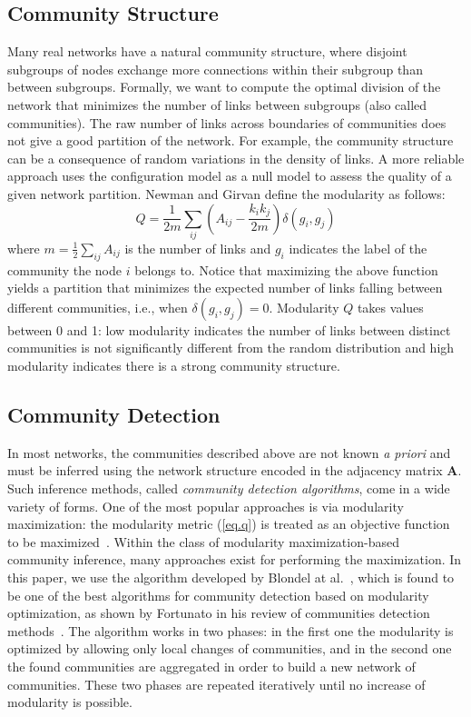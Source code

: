 \documentclass[12pt]{article}
\begin{document}
\subsection{Community Structure}

Many real networks have a natural community structure, where disjoint subgroups of nodes exchange more connections within their subgroup than between subgroups. Formally, we want to compute the optimal division of the network that minimizes the number of links between subgroups (also called  communities). The raw number of links across boundaries of communities does not give a good partition of the  network. For example, the community structure can be a consequence of random variations in the density of links. A more reliable approach uses the configuration model \cite{newman2001random} as a null model to assess the quality of a given network partition. Newman and Girvan \cite{newman2004finding} define the modularity as follows:
\begin{equation}
Q = \frac{1}{2m} \sum_{ij} \left( A_{ij} -
\frac{k_i k_j}{2m} \right) \delta(g_i,g_j)
\label{eq.q}
\end{equation}
where $m = \frac{1}{2} \sum_{ij} A_{ij}$ is the number of links and $g_i$
indicates the label of the community the node $i$
belongs to. Notice that maximizing the above function yields a partition that minimizes the 
expected number of links falling between different communities, i.e., when 
$\delta(g_i, g_j) = 0$. 
Modularity $Q$ takes values between 0 and 1: low modularity indicates the number of links 
between distinct communities is not significantly different from the random distribution and high 
modularity indicates there is a strong community structure.

\subsection{Community Detection}

In most networks, the communities described above are not known \emph{a priori} and must be inferred using the network structure encoded in the adjacency matrix $\textbf{A}$. Such inference methods, called \emph{community detection algorithms}, come in a wide variety of forms. One of the most popular approaches is via modularity maximization: the modularity metric (\ref{eq.q}) is treated as an objective function to be maximized~\cite{newman2004finding}. Within the class of modularity maximization-based community inference, many approaches exist for performing the maximization. In this paper, we use the algorithm developed by Blondel at al\@.~\cite{blondel2008fast}, which is found to be one of the best algorithms for community detection based on modularity 
optimization, as shown by Fortunato in his review of communities detection methods~\cite{fortunato2010community}. 
The algorithm works in two phases: in the first one the modularity is optimized by allowing only local changes of communities, 
and in the second one the found communities are aggregated in order to build a new network of communities. 
These two phases are repeated iteratively until no increase of modularity is possible.
\end{document}
